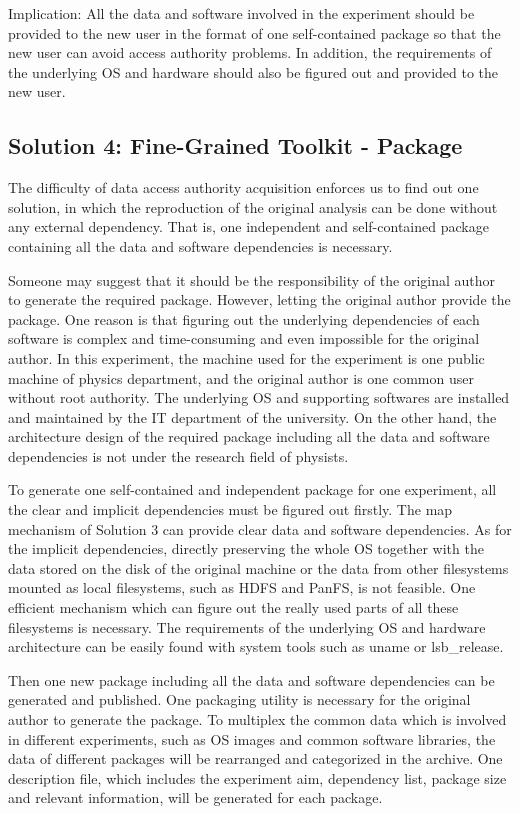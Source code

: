 \documentclass{sig-alternate}
\begin{document}
Implication: All the data and software involved in the experiment should be
provided to the new user in the format of one self-contained package so that
the new user can avoid 
access authority problems.
In addition, the requirements of the underlying
OS and hardware should also be figured out and provided to the new user.

\subsection{Solution 4: Fine-Grained Toolkit - Package}
The difficulty of data access authority acquisition enforces us to find out one
solution, in which the reproduction of the original analysis can be done
without any external dependency. That is, one independent and self-contained
package containing all the data and software dependencies is necessary. 

Someone may suggest that it should be the responsibility of the original author
to generate the required package. However, letting the original author provide
the package. 
One reason is that figuring out the underlying dependencies of
each software is complex and time-consuming and even impossible for the
original author. In this experiment, the machine used for the experiment is one
public machine of physics department, and the original author is one common user without
root authority. The underlying OS and supporting softwares are installed and
maintained by the IT department of the university. On the other hand, the
architecture design of the required package including all the data and software
dependencies is not under the research field of physists.

To generate one self-contained and independent package for one experiment, all
the clear and implicit dependencies must be figured out firstly. The map mechanism
of Solution 3 can provide clear data and software dependencies. As for the
implicit dependencies, directly preserving the whole OS together with the data
stored on the disk of the original machine or the data from other filesystems
mounted as local filesystems, such as HDFS and PanFS, is not feasible. One
efficient mechanism which can figure out the really used parts of all these
filesystems is necessary. The requirements of the underlying OS and hardware
architecture can be easily found with system tools such as uname or
lsb\_release.

Then one new package including all the data and software dependencies can be generated and published. 
One packaging utility is necessary for the original author to generate the package. 
To multiplex the common data which is involved in different experiments, such as OS images and common software libraries, the data of different packages will be rearranged and categorized in the archive.
One description file, which includes the experiment aim, dependency list,  package size and relevant information, will be generated for each package.
\end{document}
